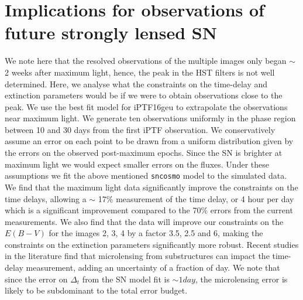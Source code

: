 \documentclass[a4paper,fleqn,usenatbib]{mnras}
\newcommand{\sn}{SN\xspace}
\begin{document}
\section{Implications for observations of future strongly lensed \sn}
\label{sec:forecast}
We note here that the resolved observations of the multiple images only began $\sim$ 2 weeks after maximum light, hence, the peak in the HST filters is not well determined. Here, we analyse what the constraints on the time-delay and extinction parameters would be if we were to obtain observations close to the peak. 
We use the best fit model for iPTF16geu to extrapolate the observations near maximum light. We generate ten observations uniformly in the phase region between 10 and 30 days from the first iPTF observation. We conservatively assume an error on each point to be drawn from a uniform distribution given by the errors on the observed post-maximum epochs. Since the SN is brighter at maximum light we would expect smaller errors on the fluxes. Under these assumptions we fit the above mentioned \texttt{sncosmo} model to the simulated data. 
We find that the maximum light data significantly improve the constraints on the time delays, allowing a $\sim$ 17$\%$ measurement of the time delay, or 4 hour per day which is a significant improvement compared to the 70$\%$ errors from the current measurements. We also find that the data will improve our constraints on the $E(B-V)$ for the images 2, 3, 4 by a factor 3.5, 2.5 and 6, making the constraints on the extinction parameters significantly more robust.  Recent studies in the literature find that microlensing from substructures can impact the time-delay measurement, adding an uncertainty of a fraction of day. We note that since the error on $\Delta_t$ from the SN model fit is $\sim 1 day$, the microlensing error is likely to be subdominant to the total error budget.
\end{document}
